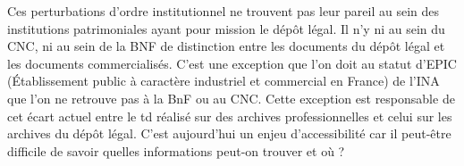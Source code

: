 
Ces perturbations d’ordre institutionnel ne trouvent pas leur pareil au sein des institutions patrimoniales ayant pour mission le dépôt légal. Il n’y ni au sein du CNC, ni au sein de la BNF de distinction entre les documents du dépôt légal et les documents commercialisés. C’est une exception que l’on doit au statut d’EPIC (Établissement public à caractère industriel et commercial en France) de l’INA que l'on ne retrouve pas à la BnF ou au CNC. Cette exception est responsable de cet écart actuel entre le \gls{td} réalisé sur des archives professionnelles et celui sur les archives du dépôt légal. C'est aujourd'hui un enjeu d'accessibilité car il peut-être difficile de savoir quelles informations peut-on trouver et où ? 